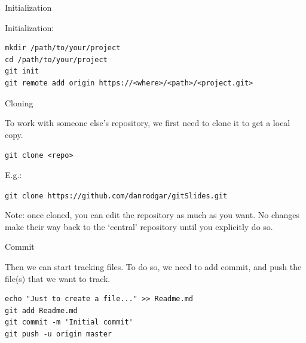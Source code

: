 \documentclass{beamer}
\begin{document}
\begin{frame}[fragile]{Initialization}

Initialization:

\begin{verbatim}
mkdir /path/to/your/project
cd /path/to/your/project
git init
git remote add origin https://<where>/<path>/<project.git>
\end{verbatim} 

% 

\end{frame}

\begin{frame}{Cloning}

To work with someone else’s repository, we first need to clone it to get a
local copy.

\texttt{git clone <repo>}

E.g.:

\texttt{git clone https://github.com/danrodgar/gitSlides.git}

Note: once cloned, you can edit the repository as much as you want. No changes make their way back to the ‘central’ repository until you explicitly do so.

\end{frame}


\begin{frame}[fragile]{Commit}

Then we can start tracking files. To do so, we need to add commit, and push the file(s) that we want to track.
%
\begin{verbatim}
echo "Just to create a file..." >> Readme.md
git add Readme.md
git commit -m 'Initial commit'
git push -u origin master
\end{verbatim}

\end{frame}
\end{document}
